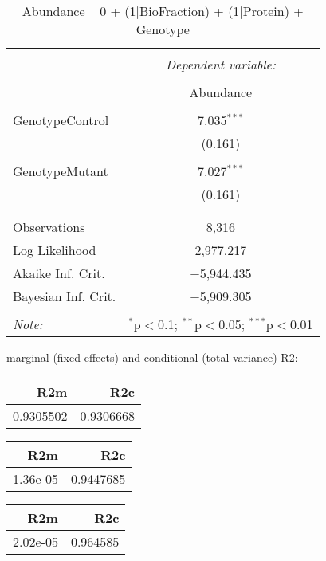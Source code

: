 \documentclass[11pt]{report}
\begin{document}
\begin{table}[!htbp] \centering 
  \caption{Abundance ~ 0 + (1|BioFraction) + (1|Protein) + Genotype} 
  \label{} 
\begin{tabular}{@{\extracolsep{5pt}}lc} 
\\[-1.8ex]\hline 
\hline \\[-1.8ex] 
 & \multicolumn{1}{c}{\textit{Dependent variable:}} \\ 
\cline{2-2} 
\\[-1.8ex] & Abundance \\ 
\hline \\[-1.8ex] 
 GenotypeControl & 7.035$^{***}$ \\ 
  & (0.161) \\ 
  & \\ 
 GenotypeMutant & 7.027$^{***}$ \\ 
  & (0.161) \\ 
  & \\ 
\hline \\[-1.8ex] 
Observations & 8,316 \\ 
Log Likelihood & 2,977.217 \\ 
Akaike Inf. Crit. & $-$5,944.435 \\ 
Bayesian Inf. Crit. & $-$5,909.305 \\ 
\hline 
\hline \\[-1.8ex] 
\textit{Note:}  & \multicolumn{1}{r}{$^{*}$p$<$0.1; $^{**}$p$<$0.05; $^{***}$p$<$0.01} \\ 
\end{tabular} 
\end{table} 
marginal (fixed effects) and conditional (total variance) R2:

\begin{tabular}{r|r}
\hline
R2m & R2c\\
\hline
0.9305502 & 0.9306668\\
\hline
\end{tabular}

\begin{tabular}{r|r}
\hline
R2m & R2c\\
\hline
1.36e-05 & 0.9447685\\
\hline
\end{tabular}

\begin{tabular}{r|r}
\hline
R2m & R2c\\
\hline
2.02e-05 & 0.964585\\
\hline
\end{tabular}
\end{document}
